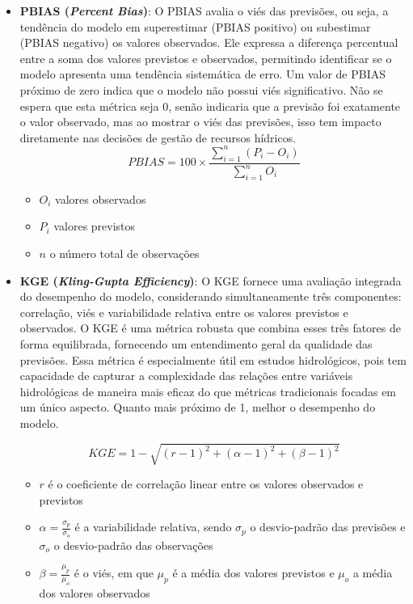 \begin{itemize}
	\item \textbf{PBIAS (\textit{Percent Bias})}: O PBIAS avalia o viés das previsões, ou seja, a tendência do modelo em superestimar (PBIAS positivo) ou subestimar (PBIAS negativo) os valores observados. Ele expressa a diferença percentual entre a soma dos valores previstos e observados, permitindo identificar se o modelo apresenta uma tendência sistemática de erro. Um valor de PBIAS próximo de zero indica que o modelo não possui viés significativo. Não se espera que esta métrica seja 0, senão indicaria que a previsão foi exatamente o valor observado, mas ao mostrar o viés das previsões, isso tem impacto diretamente nas decisões de gestão de recursos hídricos.\cite{rayyan-33388455}
	\begin{equation}
		PBIAS = 100 \times \frac{\sum_{i=1}^{n} (P_i - O_i)}{\sum_{i=1}^{n} O_i}
	\end{equation}
	\begin{itemize}
		\item $O_i$ valores observados
		\item $P_i$ valores previstos
		\item $n$ o número total de observações
	\end{itemize}
	
	\item \textbf{KGE (\textit{Kling-Gupta Efficiency})}: O KGE fornece uma avaliação integrada do desempenho do modelo, considerando simultaneamente três componentes: correlação, viés e variabilidade relativa entre os valores previstos e observados. O KGE é uma métrica robusta que combina esses três fatores de forma equilibrada, fornecendo um entendimento geral da qualidade das previsões. Essa métrica é especialmente útil em estudos hidrológicos, pois tem capacidade de capturar a complexidade das relações entre variáveis hidrológicas de maneira mais eficaz do que métricas tradicionais focadas em um único aspecto. Quanto mais próximo de 1, melhor o desempenho do modelo.\cite{Gupta2009}
	
	\begin{equation}
		KGE = 1 - \sqrt{(r - 1)^2 + (\alpha - 1)^2 + (\beta - 1)^2}
	\end{equation}
	\begin{itemize}
		\item $r$ é o coeficiente de correlação linear entre os valores observados e previstos 
		\item $\alpha = \frac{\sigma_p}{\sigma_o}$ é a variabilidade relativa, sendo $\sigma_p$ o desvio-padrão das previsões e $\sigma_o$ o desvio-padrão das observações
		\item $\beta = \frac{\mu_p}{\mu_o}$ é o viés, em que $\mu_p$ é a média dos valores previstos e $\mu_o$ a média dos valores observados		
	\end{itemize}

\end{itemize}

